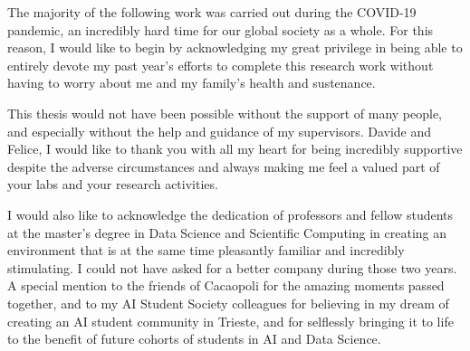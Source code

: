 \documentclass[a4paper, nobind]{templates/ociamthesis}
\begin{document}
\begin{romanpages}

\maketitle

\null\newpage

\titlespacing*{\chapter}{0pt}{0pt}{35pt}


\begin{acknowledgements}
 	The majority of the following work was carried out during the COVID-19 pandemic, an incredibly hard time for our global society as a whole. For this reason, I would like to begin by acknowledging my great privilege in being able to entirely devote my past year's efforts to complete this research work without having to worry about me and my family's health and sustenance.

\vspace{5mm}

This thesis would not have been possible without the support of many people, and especially without the help and guidance of my supervisors. Davide and Felice, I would like to thank you with all my heart for being incredibly supportive despite the adverse circumstances and always making me feel a valued part of your labs and your research activities.

\vspace{5mm}

I would also like to acknowledge the dedication of professors and fellow students at the master's degree in Data Science and Scientific Computing in creating an environment that is at the same time pleasantly familiar and incredibly stimulating. I could not have asked for a better company during those two years. A special mention to the friends of Cacaopoli for the amazing moments passed together, and to my AI Student Society colleagues for believing in my dream of creating an AI student community in Trieste, and for selflessly bringing it to life to the benefit of future cohorts of students in AI and Data Science.


\end{acknowledgements}
\end{romanpages}
\end{document}

